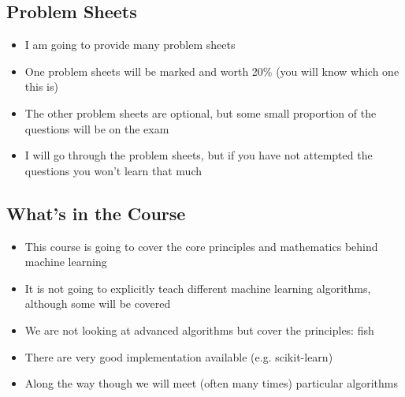 
\begin{slide}
\section{Problem Sheets}

\begin{PauseHighLight}
  \begin{itemize}
  \item I am going to provide many problem sheets\pause
  \item One problem sheets will be marked and worth 20\% (you will
    know which one this is)\pause
  \item The other problem sheets are optional, but some small
    proportion of the questions will be on the exam\pause
  \item I will go through the problem sheets, but if you have not
    attempted the questions you won't learn that much\pause
  \end{itemize}
\end{PauseHighLight}

\end{slide}


\begin{slide}
  \section[-1]{What's in the Course}

  \begin{PauseHighLight}
    \begin{itemize}
    \item This course is going to cover the core principles and
      mathematics behind machine learning\pause
    \item It is not going to explicitly teach different machine
      learning algorithms\pause, although some will be covered\pauseb
    \item We are not looking at advanced algorithms but cover the
      principles\pause: fish\pauseb
    \item There are very good implementation available (e.g.{}
      scikit-learn)\pause
    \item Along the way though we will meet (often many times)
      particular algorithms\pause
    \end{itemize}
  \end{PauseHighLight}

\end{slide}

